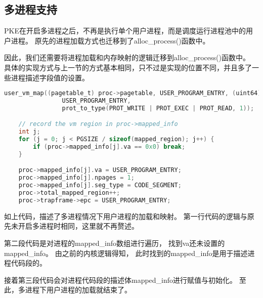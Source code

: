 \subsection{多进程支持}

PKE在开启多进程之后，不再是执行单个用户进程，而是调度运行进程池中的用户进程。
原先的进程加载方式也迁移到了alloc\_process()函数中。

因此，我们还需要将进程加载和内存映射的逻辑迁移到alloc\_process()函数中。
具体的实现方式与上一节的方式基本相同，只不过是实现的位置不同，并且多了一些进程描述字段值的设置。

\begin{lstlisting}[caption={多进程情况下用户进程的加载和映射}, label={lst:user_process_map_multi}, language=C]
    user_vm_map((pagetable_t) proc->pagetable, USER_PROGRAM_ENTRY, (uint64) _etext - USER_PROGRAM_ENTRY,
                USER_PROGRAM_ENTRY,
                prot_to_type(PROT_WRITE | PROT_EXEC | PROT_READ, 1));

    // record the vm region in proc->mapped_info
    int j;
    for (j = 0; j < PGSIZE / sizeof(mapped_region); j++) {
        if (proc->mapped_info[j].va == 0x0) break;
    }

    proc->mapped_info[j].va = USER_PROGRAM_ENTRY;
    proc->mapped_info[j].npages = 1;
    proc->mapped_info[j].seg_type = CODE_SEGMENT;
    proc->total_mapped_region++;
    proc->trapframe->epc = USER_PROGRAM_ENTRY;    
\end{lstlisting}

如上代码，描述了多进程情况下用户进程的加载和映射。
第一行代码的逻辑与原先未开启多进程时相同，这里就不再赘述。

第二段代码是对进程的mapped\_info数组进行遍历，
找到va还未设置的mapped\_info。
由之前的内核逻辑得知，
此时找到的mapped\_info是用于描述进程代码段的。

接着第三段代码会对进程代码段的描述体mapped\_info进行赋值与初始化。
至此，多进程下用户进程的加载就结束了。


